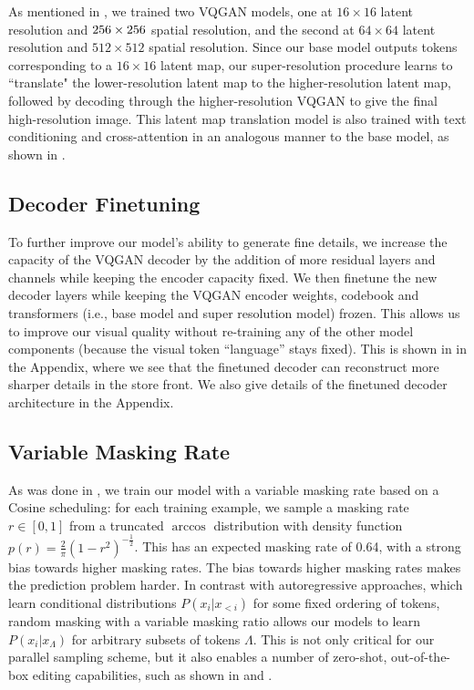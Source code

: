As mentioned in , we trained two VQGAN models, one at $16\times16$ latent resolution and $256\times256$ spatial resolution, and the second at $64\times64$ latent resolution and $512\times512$ spatial resolution. Since our base model outputs tokens corresponding to a $16\times16$ latent map, our super-resolution procedure learns to ``translate" the lower-resolution latent map to the higher-resolution latent map, followed by decoding through the higher-resolution VQGAN to give the final high-resolution image. This latent map translation model is also trained with text conditioning and cross-attention in an analogous manner to the base model, as shown in . 

\subsection{Decoder Finetuning}
\label{sec:dec_finetune}
To further improve our model's ability to generate fine details, we increase the capacity of the VQGAN decoder by the addition of more residual layers and channels while keeping the encoder capacity fixed. We then finetune the new decoder layers while keeping the VQGAN encoder weights, codebook and transformers (i.e., base model and super resolution model) frozen. This allows us to improve our visual quality without re-training any of the other model components (because the visual token ``language'' stays fixed). This is shown in  in the Appendix, where we see that the finetuned decoder can reconstruct more sharper details in the store front. We also give details of the finetuned decoder architecture in the Appendix.

\subsection{Variable Masking Rate}
\label{sec:masking}
As was done in \cite{maskgit}, we train our model with a variable masking rate based on a Cosine scheduling: for each training example, we sample a masking rate $r\in[0,1]$ from a truncated $\arccos$ distribution with density function $p(r)=\frac{2}{\pi}(1-r^2)^{-\frac{1}{2}}$. This has an expected masking rate of 0.64, with a strong bias towards higher masking rates. The bias towards higher masking rates makes the prediction problem harder. In contrast with autoregressive approaches, which learn conditional distributions $P(x_i | x_{<i})$ for some fixed ordering of tokens, random masking with a variable masking ratio allows our models to learn $P(x_i | x_{\Lambda})$ for arbitrary subsets of tokens $\Lambda$. This is not only critical for our parallel sampling scheme, but it also enables a number of zero-shot, out-of-the-box editing capabilities, such as shown in  and .

